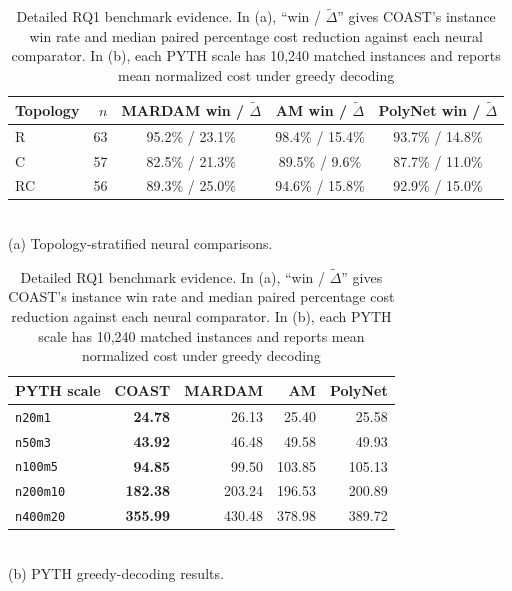 \documentclass[letterpaper]{article}
\begin{document}
\begin{table}[t]
\caption{Detailed RQ1 benchmark evidence. In (a), ``win / $\tilde{\Delta}$'' gives COAST's instance win rate and median paired percentage cost reduction against each neural comparator. In (b), each PYTH scale has 10,240 matched instances and reports mean normalized cost under greedy decoding}
\label{tab:rq1_detail}
\centering
\begin{minipage}[t]{0.47\textwidth}
\centering
{\small
\setlength{\tabcolsep}{3.0pt}
\begin{tabular}{lrccc}
\toprule
Topology & $n$ & \shortstack{MARDAM\\win / $\tilde{\Delta}$} & \shortstack{AM\\win / $\tilde{\Delta}$} & \shortstack{PolyNet\\win / $\tilde{\Delta}$} \\
\midrule
R  & 63 & 95.2\% / 23.1\% & 98.4\% / 15.4\% & 93.7\% / 14.8\% \\
C  & 57 & 82.5\% / 21.3\% & 89.5\% / 9.6\%  & 87.7\% / 11.0\% \\
RC & 56 & 89.3\% / 25.0\% & 94.6\% / 15.8\% & 92.9\% / 15.0\% \\
\bottomrule
\end{tabular}
}\\[1pt]
\footnotesize (a) Topology-stratified neural comparisons.
\end{minipage}\hfill
\begin{minipage}[t]{0.47\textwidth}
\centering
{\small
\setlength{\tabcolsep}{4.5pt}
\begin{tabular}{lrrrr}
\toprule
PYTH scale & COAST & MARDAM & AM & PolyNet \\
\midrule
\texttt{n20m1} & \textbf{24.78} & 26.13 & 25.40 & 25.58 \\
\texttt{n50m3}             & \textbf{43.92} & 46.48 & 49.58 & 49.93 \\
\texttt{n100m5}            & \textbf{94.85} & 99.50 & 103.85 & 105.13 \\
\texttt{n200m10}           & \textbf{182.38} & 203.24 & 196.53 & 200.89 \\
\texttt{n400m20}           & \textbf{355.99} & 430.48 & 378.98 & 389.72 \\
\bottomrule
\end{tabular}
}\\[1pt]
\footnotesize (b) PYTH greedy-decoding results.
\end{minipage}

\end{table}
\end{document}
